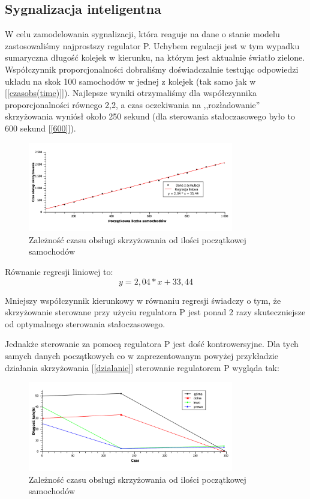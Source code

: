 \documentclass[11pt]{aghdpl}
\begin{document}
\subsection{Sygnalizacja inteligentna}
W celu zamodelowania sygnalizacji, która reaguje na dane o stanie modelu zastosowaliśmy najprostszy regulator P. Uchybem regulacji jest w tym wypadku sumaryczna długość kolejek w kierunku, na którym jest aktualnie światło zielone.
Współczynnik proporcjonalności dobraliśmy doświadczalnie testując odpowiedzi układu na skok 100 samochodów w jednej z kolejek (tak samo jak w [\ref{czasobs(time)}]). Najlepsze wyniki otrzymaliśmy dla współczynnika proporcjonalności równego 2,2, a czas oczekiwania na ,,rozładowanie'' skrzyżowania wyniósł około 250 sekund (dla sterowania stałoczasowego było to 600 sekund [\ref{600}]).

\begin{figure}[h!]
	\centering
	\includegraphics[width=0.80\textwidth]{czasobs(ilosc)2.pdf}
	\caption{Zależność czasu obsługi skrzyżowania od ilości początkowej samochodów}	
	\label{czasobs(ilosc)2}
\end{figure}

Równanie regresji liniowej to:
\begin{equation}
	 y = 2,04 * x + 33,44
\end{equation}

Mniejszy współczynnik kierunkowy w równaniu regresji świadczy o tym, że skrzyżowanie sterowane przy użyciu regulatora P jest ponad 2 razy skuteczniejsze od optymalnego sterowania stałoczasowego.

Jednakże sterowanie za pomocą regulatora P jest dość kontrowersyjne. Dla tych samych danych początkowych co w zaprezentowanym powyżej przykładzie działania skrzyżowania [\ref{dzialanie}] sterowanie regulatorem P wygląda tak:
\begin{figure}[h!]
	\centering
	\includegraphics[width=0.80\textwidth]{dzialanie2.pdf}
	\caption{Zależność czasu obsługi skrzyżowania od ilości początkowej samochodów}	
	\label{dzialanie2}
\end{figure}
\end{document}
